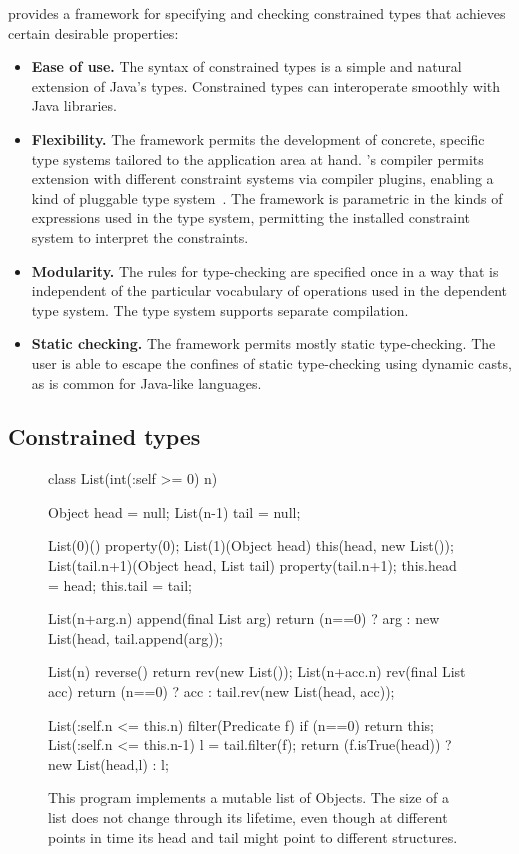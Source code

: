 \Xten{} provides a framework for specifying and checking constrained types
that achieves certain desirable properties:
\begin{itemize}
\item 
{\bf Ease of use.}  
The syntax of constrained types is a simple and
natural extension of Java's types.  Constrained types can
interoperate smoothly with Java libraries.

\item
{\bf Flexibility.}
The framework
permits the development of concrete,
specific type systems tailored to the application area at
hand.  \Xten{}'s compiler permits extension with different constraint systems
via compiler plugins, enabling a kind of pluggable type system~\cite{bracha04-pluggable}.
The framework is parametric in the kinds of
expressions used in the type system, permitting the installed constraint
system to interpret the constraints.

\item
{\bf Modularity.}
The rules for type-checking
are specified once in a way that is independent of the
particular vocabulary of operations used in the dependent type
system.
The type system supports separate compilation.

\item
{\bf Static checking.}  The framework permits mostly static
type-checking. The user is able to escape the confines of
static type-checking using dynamic casts, as is common for Java-like
languages.
\end{itemize}

\subsection{Constrained types}

\begin{figure}[t]
\begin{xten}
class List(int(:self >= 0) n) {
  Object head = null;
  List(n-1) tail = null;

  List(0)() { property(0); }
  List(1)(Object head) { this(head, new List());}
  List(tail.n+1)(Object head, List tail) {
    property(tail.n+1);
    this.head = head;
    this.tail = tail;
  }

  List(n+arg.n) append(final List arg) {
    return (n==0) ? arg : new List(head, tail.append(arg));
  }

  List(n) reverse() { return rev(new List()); }
  List(n+acc.n) rev(final List acc) {
    return (n==0) ? acc : tail.rev(new List(head, acc));
  }

  List(:self.n <= this.n) filter(Predicate f) {
    if (n==0) return this;
    List(:self.n <= this.n-1) l = tail.filter(f);
    return (f.isTrue(head)) ? new List(head,l) : l;
  }
}
\end{xten}
\caption{
This program implements a mutable list of Objects. The size of a list
does not change through its lifetime, even though at different points
in time its head and tail might point to different structures.}
\label{fig:list-example}
\end{figure}

